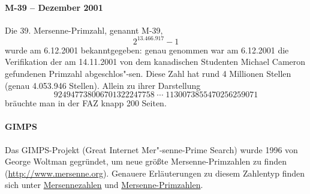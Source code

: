 \begin{refsegment}
\paragraph*{M-39 -- Dezember 2001}
\mbox{}

Die 39. Mersenne-Primzahl, genannt M-39, $$2^{13.466.917}-1$$
wurde am 6.12.2001 bekanntgegeben: genau genommen war am 6.12.2001
die Verifikation der am 14.11.2001 von dem kanadischen Studenten
Michael Cameron gefundenen Primzahl abgeschlos"-sen.
Diese Zahl hat rund 4 Millionen Stellen (genau 4.053.946 Stellen).
Allein zu ihrer Darstellung
$$
924947738006701322247758 \; \cdots  \; 1130073855470256259071
$$
bräuchte man in der FAZ knapp 200 Seiten.






\paragraph*{GIMPS}\mbox{}
\hypertarget{GIMPS-project}{}

Das GIMPS-Projekt (Great Internet Mer"-senne-Prime Search)
wurde 1996 von George Woltman gegründet, um neue
größte Mersenne-Primzahlen zu finden ({\url{http://www.mersenne.org}}).
Genauere Erläuterungen zu diesem Zahlentyp finden sich unter
\hyperlink{MersenneNumbers02}{Mersennezahlen} und
\hyperlink{MersenneNumbers01}{Mersenne-Primzahlen}.


\end{refsegment}
